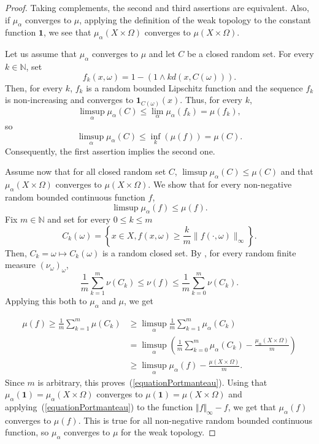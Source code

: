 \documentclass{amsart}
\theoremstyle{definition}
\theoremstyle{remark}
\begin{document}
\begin{proof}
Taking complements, the second and third assertions are equivalent.
Also, if $\mu_\alpha$ converges to $\mu$, applying the definition of the weak topology to the constant function $\mathbf 1$, we see that $\mu_\alpha(X\times \Omega)$ converges to $\mu(X\times \Omega)$.

Let us assume that $\mu_\alpha$ converges to $\mu$ and let $C$ be a closed random set.
For every $k\in \mathbb N$, set
$$f_k(x,\omega)=1-(1\wedge kd(x,C(\omega))).$$
Then, for every $k$, $f_k$ is a random bounded Lipschitz function and the sequence $f_k$ is non-increasing and converges to $\mathbf 1_{C(\omega)}(x)$.
Thus, for every $k$,
$$\limsup_\alpha \mu_\alpha(C)\leq \lim_\alpha \mu_\alpha(f_k)=\mu(f_k),$$
so
$$\limsup_\alpha \mu_\alpha(C)\leq \inf_k(\mu(f))=\mu(C).$$
Consequently, the first assertion implies the second one.

Assume now that for all closed random set $C$, $\limsup \mu_\alpha(C)\leq \mu(C)$ and that $\mu_\alpha(X\times \Omega)$ converges to $\mu(X\times \Omega)$.
We show that for every non-negative random bounded continuous function $f$,
\begin{equation}\label{equationPortmanteau}
\limsup \mu_\alpha(f)\leq \mu(f).
\end{equation}
Fix $m\in \mathbb N$ and set for every $0\leq k\leq m$
$$C_k(\omega)=\left \{x\in X,f(x,\omega)\geq \frac{k}{m}\|f(\cdot,\omega)\|_\infty\right \}.$$
Then, $C_k=\omega\mapsto C_k(\omega)$ is a random closed set.
By \cite[Lemma~1.4]{Crauel}, for every random finite measure $(\nu_\omega)_\omega$,
$$\frac{1}{m}\sum_{k=1}^m\nu(C_k)\leq \nu(f)\leq \frac{1}{m}\sum_{k=0}^m\nu(C_k).$$
Applying this both to $\mu_\alpha$ and $\mu$, we get

\begin{align*}
\mu(f)\geq \frac{1}{m}\sum_{k=1}^m\mu(C_k)&\geq \limsup_\alpha\frac{1}{m}\sum_{k=1}^m\mu_\alpha(C_k)\\
&=\limsup_\alpha\left (\frac{1}{m}\sum_{k=0}^m\mu_\alpha(C_k)-\frac{\mu_\alpha(X\times \Omega)}{m}\right )\\
&\geq \limsup_\alpha\mu_\alpha(f)-\frac{\mu(X\times\Omega)}{m}.
\end{align*}
Since $m$ is arbitrary, this proves~(\ref{equationPortmanteau}).
Using that $\mu_\alpha(\mathbf 1)=\mu_\alpha(X\times \Omega)$ converges to $\mu(\mathbf 1)=\mu(X\times \Omega)$ and applying~(\ref{equationPortmanteau}) to the function $\Vert f\Vert_{\infty}-f$, we get that
$\mu_\alpha(f)$ converges to $\mu(f)$.
This is true for all non-negative random bounded continuous function, so $\mu_\alpha$ converges to $\mu$ for the weak topology.
\end{proof}
\end{document}
